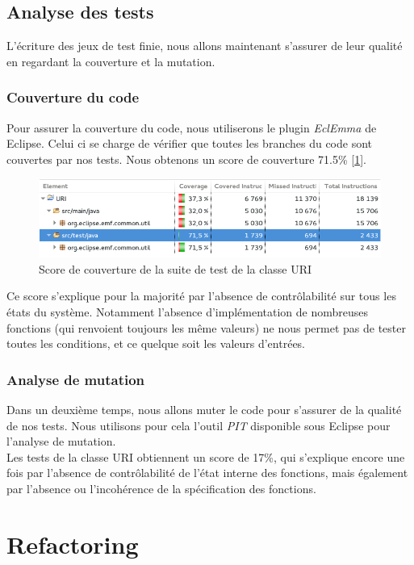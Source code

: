 \documentclass[a4paper,11pt]{article}
\newcommand{\br}{\\\mbox{}}
\begin{document}
\subsection{Analyse des tests}
L'écriture des jeux de test finie, nous allons maintenant s'assurer de leur qualité en regardant la couverture et la mutation.
\subsubsection*{Couverture du code}
Pour assurer la couverture du code, nous utiliserons le plugin \textit{EclEmma} de Eclipse. Celui ci se charge de vérifier que toutes les branches du code sont couvertes par nos tests. Nous obtenons un score de couverture 71.5\% [\ref{Couv}].

\begin{figure}[h]
\includegraphics[scale=0.5]{Couverture.png}
\caption{Score de couverture de la suite de test de la classe URI}
\label{Couv}
\end{figure}

Ce score s'explique pour la majorité par l'absence de contrôlabilité sur tous les états du système. Notamment l'absence d'implémentation de nombreuses fonctions (qui renvoient toujours les même valeurs) ne nous permet pas de tester toutes les conditions, et ce quelque soit les valeurs d'entrées.

\subsubsection*{Analyse de mutation}

Dans un deuxième temps, nous allons muter le code pour s'assurer de la qualité de nos tests. Nous utilisons pour cela l'outil \textit{PIT} disponible sous Eclipse pour l'analyse de mutation.\br
Les tests de la classe URI obtiennent un score de 17\%, qui s'explique encore une fois par l'absence de contrôlabilité de l'état interne des fonctions, mais également par l'absence ou l'incohérence de la spécification des fonctions.

\section{Refactoring}
\end{document}
